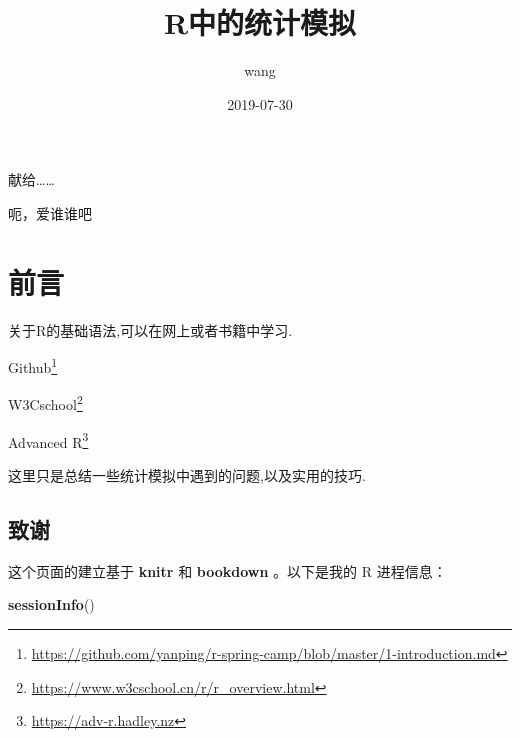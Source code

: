 \documentclass[]{ctexbook}
\title{R中的统计模拟}
\author{wang}
\date{2019-07-30}
\newenvironment{Shaded}{\begin{snugshade}}{\end{snugshade}}
\newcommand{\KeywordTok}[1]{\textcolor[rgb]{0.13,0.29,0.53}{\textbf{#1}}}
\newcommand{\NormalTok}[1]{#1}
\renewcommand{\href}[2]{#2\footnote{\url{#1}}}
\begin{document}
\maketitle


\thispagestyle{empty}

\begin{center}
献给……

呃，爱谁谁吧
\end{center}

\setlength{\abovedisplayskip}{-5pt}
\setlength{\abovedisplayshortskip}{-5pt}

{
\setcounter{tocdepth}{2}
\tableofcontents
}
\listoftables
\listoffigures
\hypertarget{section}{%
\chapter*{前言}\label{section}}


关于R的基础语法,可以在网上或者书籍中学习.

\href{https://github.com/yanping/r-spring-camp/blob/master/1-introduction.md}{Github}

\href{https://www.w3cschool.cn/r/r_overview.html}{W3Cschool}

\href{https://adv-r.hadley.nz}{Advanced R}

这里只是总结一些统计模拟中遇到的问题,以及实用的技巧.

\hypertarget{section-1}{%
\section*{致谢}\label{section-1}}


这个页面的建立基于 \textbf{knitr} \citep{xie2015}和 \textbf{bookdown} \citep{R-bookdown}。以下是我的 R 进程信息：

\begin{Shaded}
\begin{Highlighting}[]
\KeywordTok{sessionInfo}\NormalTok{()}
\end{Highlighting}
\end{Shaded}
\end{document}
